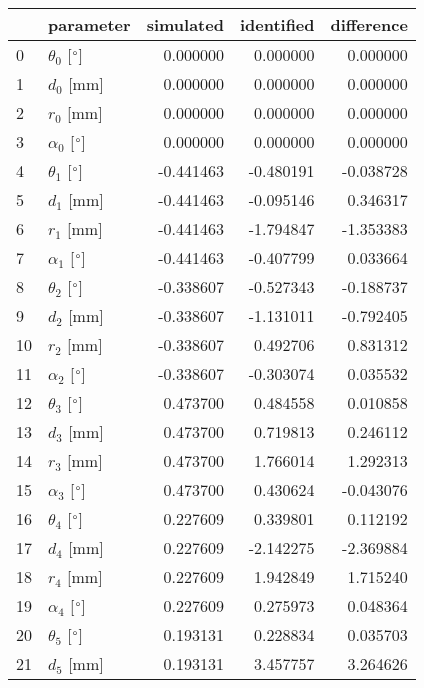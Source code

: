 \documentclass{standalone}%
\begin{document}
%
\normalsize%
\begin{tabular}{llrrr}
\toprule
{} &                 parameter & simulated & identified & difference \\
\midrule
0  &  $\theta_{0}$ [$\degree$] &  0.000000 &   0.000000 &   0.000000 \\
1  &              $d_{0}$ [mm] &  0.000000 &   0.000000 &   0.000000 \\
2  &              $r_{0}$ [mm] &  0.000000 &   0.000000 &   0.000000 \\
3  &  $\alpha_{0}$ [$\degree$] &  0.000000 &   0.000000 &   0.000000 \\
4  &  $\theta_{1}$ [$\degree$] & -0.441463 &  -0.480191 &  -0.038728 \\
5  &              $d_{1}$ [mm] & -0.441463 &  -0.095146 &   0.346317 \\
6  &              $r_{1}$ [mm] & -0.441463 &  -1.794847 &  -1.353383 \\
7  &  $\alpha_{1}$ [$\degree$] & -0.441463 &  -0.407799 &   0.033664 \\
8  &  $\theta_{2}$ [$\degree$] & -0.338607 &  -0.527343 &  -0.188737 \\
9  &              $d_{2}$ [mm] & -0.338607 &  -1.131011 &  -0.792405 \\
10 &              $r_{2}$ [mm] & -0.338607 &   0.492706 &   0.831312 \\
11 &  $\alpha_{2}$ [$\degree$] & -0.338607 &  -0.303074 &   0.035532 \\
12 &  $\theta_{3}$ [$\degree$] &  0.473700 &   0.484558 &   0.010858 \\
13 &              $d_{3}$ [mm] &  0.473700 &   0.719813 &   0.246112 \\
14 &              $r_{3}$ [mm] &  0.473700 &   1.766014 &   1.292313 \\
15 &  $\alpha_{3}$ [$\degree$] &  0.473700 &   0.430624 &  -0.043076 \\
16 &  $\theta_{4}$ [$\degree$] &  0.227609 &   0.339801 &   0.112192 \\
17 &              $d_{4}$ [mm] &  0.227609 &  -2.142275 &  -2.369884 \\
18 &              $r_{4}$ [mm] &  0.227609 &   1.942849 &   1.715240 \\
19 &  $\alpha_{4}$ [$\degree$] &  0.227609 &   0.275973 &   0.048364 \\
20 &  $\theta_{5}$ [$\degree$] &  0.193131 &   0.228834 &   0.035703 \\
21 &              $d_{5}$ [mm] &  0.193131 &   3.457757 &   3.264626 \\

\end{tabular}
\end{document}
